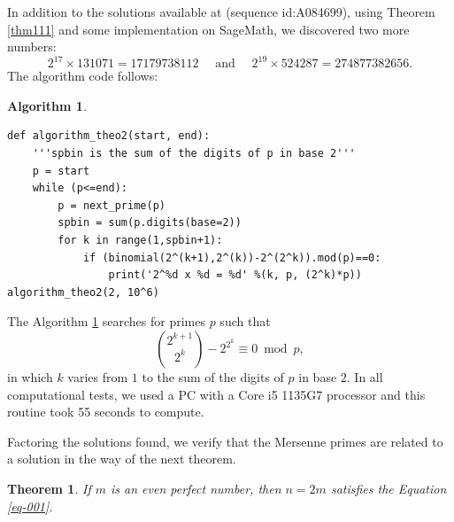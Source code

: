 \documentclass[11pt,a4paper]{article}
\newtheorem{theorem}{Theorem}[section]
\newtheorem{algorithm}{Algorithm}[section]
\begin{document}
In addition to the solutions available at \cite{oeis} (sequence id:A084699),
using Theorem \ref{thm111} and some implementation on SageMath, we discovered two more numbers: 
$$2^{17} \times 131071 = 17179738112 \quad \text{ and } \quad 2^{19} \times 524287 = 274877382656.$$ 
The algorithm code follows:
\begin{algorithm}\label{algo01} \rm \footnotesize
\mbox{ }
\begin{lstlisting}
def algorithm_theo2(start, end):
    '''spbin is the sum of the digits of p in base 2'''
    p = start
    while (p<=end):
        p = next_prime(p)
        spbin = sum(p.digits(base=2)) 
        for k in range(1,spbin+1):
            if (binomial(2^(k+1),2^(k))-2^(2^k)).mod(p)==0:
                print('2^%d x %d = %d' %(k, p, (2^k)*p))
algorithm_theo2(2, 10^6)
\end{lstlisting}
\end{algorithm}
The Algorithm \ref{algo01} searches for primes $p$ such that 
$$ \binom{2^{k+1}}{2^k}-2^{2^k} \equiv 0 \bmod p, $$
in which $k$ varies from $1$ to the sum of the digits of $p$ in base $2$. In all computational tests, we used a PC with a Core i5 1135G7 processor and this routine took 55 seconds to compute.


Factoring the solutions found, we verify that the Mersenne primes are related to a solution in the way of the next theorem.


\begin{theorem} \label{cor-perfect-number}
If $m$ is an even perfect number, then $n=2m$ satisfies the Equation \eqref{eq-001}.
\end{theorem}
\end{document}
